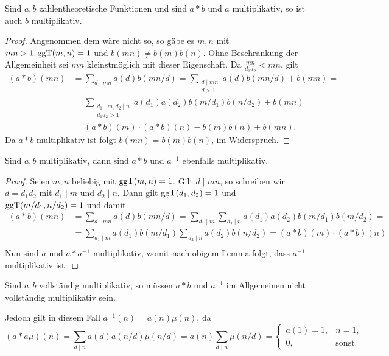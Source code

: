 \begin{lemma}
    Sind $a, b$ zahlentheoretische Funktionen und sind $a \ast b$ und $a$ multiplikativ, so ist auch $b$ multiplikativ.
\end{lemma}

\begin{proof}
    Angenommen dem wäre nicht so, so gäbe es $m, n$ mit $mn > 1, \operatorname*{ggT}(m,n)=1$ und $b(mn) \neq b(m) b(n)$. Ohne Beschränkung der Allgemeinheit sei $mn$ kleinstmöglich mit dieser Eigenschaft. Da $\frac{mn}{d_1 d_2} < mn$, gilt
    \begin{align*}
        (a \ast b)(mn) &= \sum_{d \mid mn} a(d) b(mn/d) = \sum_{\substack{d \mid mn \\ d > 1}} a(d) b(mn/d) + b(mn) = \\
        &= \sum_{\substack{d_1 \mid m, d_2 \mid n \\ d_1 d_2 > 1}} a(d_1) a(d_2) b(m/d_1) b(n/d_2) + b(mn) = \\
        &= (a \ast b)(m) \cdot (a \ast b)(n) - b(m)b(n) + b(mn).
    \end{align*}
    Da $a \ast b$ multiplikativ ist folgt $b(mn) = b(m)b(n)$, im Widerspruch.
\end{proof}

\begin{theorem} \label{thm:multiplikativ-vererbt-auf-produkt-und-inverse}
    Sind $a, b$ multiplikativ, dann sind $a \ast b$ und $a^{-1}$ ebenfalls multiplikativ.
\end{theorem}

\begin{proof}
    Seien $m, n$ beliebig mit $\operatorname*{ggT}(m,n)=1$. Gilt $d \mid mn$, so schreiben wir $d = d_1 d_2$ mit $d_1 \mid m$ und $d_2 \mid n$. Dann gilt $\operatorname*{ggT}(d_1, d_2) = 1$ und $\operatorname*{ggT}(m/d_1, n/d_2) = 1$ und damit
    \begin{align*}
        (a \ast b)(mn) &= \sum_{d \mid mn} a(d) b(mn/d) = \sum_{d_1 \mid m} \sum_{d_2 \mid n} a(d_1) a(d_2) b(m/d_1) b(m/d_2) = \\
        &= \sum_{d_1 \mid m} a(d_1) b(m/d_1) \sum_{d_2 \mid n} a(d_2) b(n/d_2) = (a \ast b)(m) \cdot (a \ast b)(n) \\
    \end{align*}
    Nun sind $a$ und $a \ast a^{-1}$ multiplikativ, womit nach obigem Lemma folgt, dass $a^{-1}$ multiplikativ ist.
\end{proof}

\begin{remark}
    Sind $a, b$ vollständig multiplikativ, so müssen $a \ast b$ und $a^{-1}$ im Allgemeinen nicht vollständig multiplikativ sein.
    
    Jedoch gilt in diesem Fall $a^{-1}(n) = a(n) \mu(n)$, da
    $$ (a \ast a \mu)(n) = \sum_{d \mid n} a(d) a(n/d) \mu(n/d) = a(n) \sum_{d \mid n} \mu(n/d) = \left\{ \begin{array}{ll} a(1) = 1, & n=1, \\ 0, & \textrm{sonst}. \end{array} \right. $$
\end{remark}

